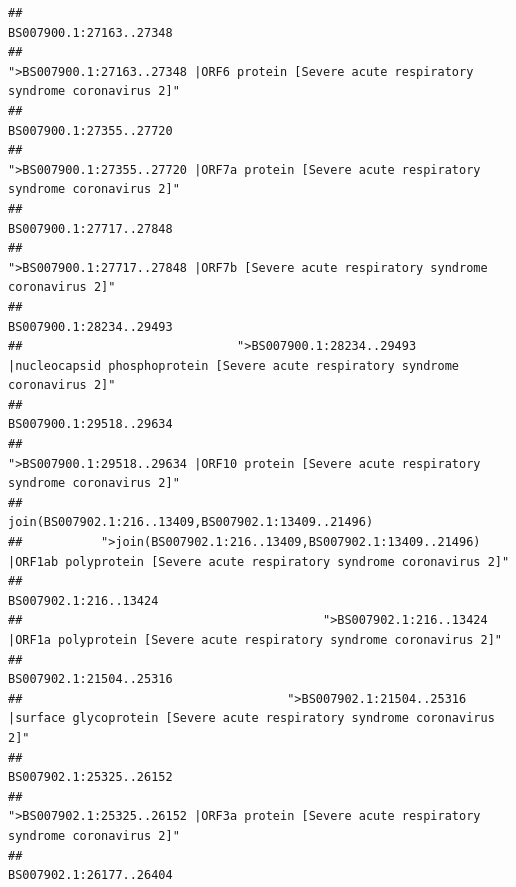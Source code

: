 \documentclass[
]{article}
\begin{document}
\begin{verbatim}
##                                                                                                                BS007900.1:27163..27348 
##                                             ">BS007900.1:27163..27348 |ORF6 protein [Severe acute respiratory syndrome coronavirus 2]" 
##                                                                                                                BS007900.1:27355..27720 
##                                            ">BS007900.1:27355..27720 |ORF7a protein [Severe acute respiratory syndrome coronavirus 2]" 
##                                                                                                                BS007900.1:27717..27848 
##                                                    ">BS007900.1:27717..27848 |ORF7b [Severe acute respiratory syndrome coronavirus 2]" 
##                                                                                                                BS007900.1:28234..29493 
##                              ">BS007900.1:28234..29493 |nucleocapsid phosphoprotein [Severe acute respiratory syndrome coronavirus 2]" 
##                                                                                                                BS007900.1:29518..29634 
##                                            ">BS007900.1:29518..29634 |ORF10 protein [Severe acute respiratory syndrome coronavirus 2]" 
##                                                                                    join(BS007902.1:216..13409,BS007902.1:13409..21496) 
##           ">join(BS007902.1:216..13409,BS007902.1:13409..21496) |ORF1ab polyprotein [Severe acute respiratory syndrome coronavirus 2]" 
##                                                                                                                  BS007902.1:216..13424 
##                                          ">BS007902.1:216..13424 |ORF1a polyprotein [Severe acute respiratory syndrome coronavirus 2]" 
##                                                                                                                BS007902.1:21504..25316 
##                                     ">BS007902.1:21504..25316 |surface glycoprotein [Severe acute respiratory syndrome coronavirus 2]" 
##                                                                                                                BS007902.1:25325..26152 
##                                            ">BS007902.1:25325..26152 |ORF3a protein [Severe acute respiratory syndrome coronavirus 2]" 
##                                                                                                                BS007902.1:26177..26404 

\end{verbatim}
\end{document}
